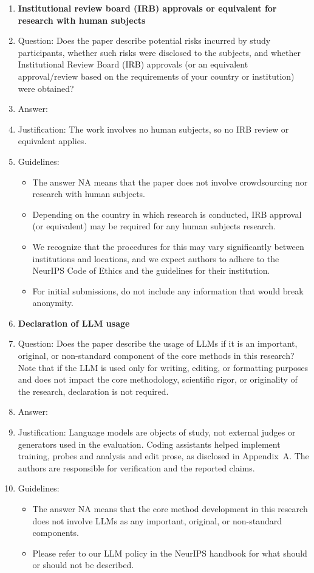 \begin{enumerate}
\item {\bf Institutional review board (IRB) approvals or equivalent for research with human subjects}
    \item[] Question: Does the paper describe potential risks incurred by study participants, whether such risks were disclosed to the subjects, and whether Institutional Review Board (IRB) approvals (or an equivalent approval/review based on the requirements of your country or institution) were obtained?
    \item[] Answer: \answerNA{}
    \item[] Justification: The work involves no human subjects, so no IRB review or equivalent applies.
    \item[] Guidelines:
    \begin{itemize}
        \item The answer NA means that the paper does not involve crowdsourcing nor research with human subjects.
        \item Depending on the country in which research is conducted, IRB approval (or equivalent) may be required for any human subjects research.
        \item We recognize that the procedures for this may vary significantly between institutions and locations, and we expect authors to adhere to the NeurIPS Code of Ethics and the guidelines for their institution.
        \item For initial submissions, do not include any information that would break anonymity.
    \end{itemize}

\item {\bf Declaration of LLM usage}
    \item[] Question: Does the paper describe the usage of LLMs if it is an important, original, or non-standard component of the core methods in this research? Note that if the LLM is used only for writing, editing, or formatting purposes and does not impact the core methodology, scientific rigor, or originality of the research, declaration is not required.
    \item[] Answer: \answerNA{}
    \item[] Justification: Language models are objects of study, not external judges or generators used in the evaluation. Coding assistants helped implement training, probes and analysis and edit prose, as disclosed in Appendix~A. The authors are responsible for verification and the reported claims.
    \item[] Guidelines:
    \begin{itemize}
        \item The answer NA means that the core method development in this research does not involve LLMs as any important, original, or non-standard components.
        \item Please refer to our LLM policy in the NeurIPS handbook for what should or should not be described.
    \end{itemize}

\end{enumerate}
